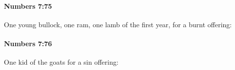 		\paragraph{Numbers 7:75} %
			\label{NUMBERS-7-75}

			One young bullock, one ram, one lamb of the first year, for a burnt offering:


		\paragraph{Numbers 7:76} %
			\label{NUMBERS-7-76}

			One kid of the goats for a sin offering:


